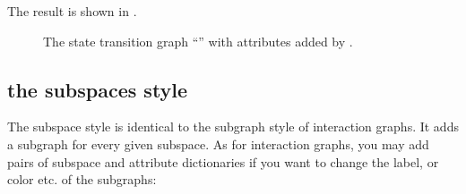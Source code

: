 \documentclass[letterpaper,10pt,english]{sphinxmanual}
\begin{document}
\begin{sphinxVerbatim}[commandchars=\\\{\}]
  \PYG{p}{[}  \PYG{p}{]}
  
   
\PYG{p}{[}\PYG{p}{]}  
 
 
\end{sphinxVerbatim}

The result is shown in {\hyperref[\detokenize{Manual:figure14}]{}}.

\begin{figure}[htbp]
\centering
\capstart

\noindent{}
\caption{The state transition graph “” with attributes added by {\hyperref[\detokenize{StateTransitionGraphs:add-style-mintrapspaces}]{}}.}\label{\detokenize{Manual:figure14}}\label{\detokenize{Manual:id18}}\end{figure}


\subsection{the subspaces style}
\label{\detokenize{Manual:the-subspaces-style}}
The subspace style is identical to the subgraph style of interaction graphs.
It adds a subgraph for every given subspace.
As for interaction graphs, you may add pairs of subspace and attribute dictionaries if you want to change the label, or color etc. of the subgraphs:
\end{document}
